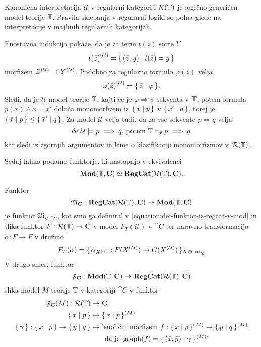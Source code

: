 \documentclass[../kategoricna_logika.tex]{subfiles}
\begin{document}
\begin{izrek}\label{izrek:logicno-genericen-model-regularne-logike}
  Kanonična interpretacija $\mathcal{U}$ v regularni kategoriji
  $\mathcal{R}(\mathbb{T})$ je logično generičen model teorije $\mathbb{T}$. Pravila
  sklepanja v regularni logiki so polna glede na interpretacije v
  majhnih regularnih kategorijah.
\end{izrek}
\begin{dokaz}
  Enostavna indukcija pokaže, da je za term $t(\bar{z})$ sorte $Y$
$${t(\bar{z})}^{(\mathcal{U})} = \lbrace\,(\bar{z},y) \mid  t(\bar{z}) = y\,\rbrace$$
morfizem ${\bar{Z}}^{(\mathcal{U})} \to {Y}^{(\mathcal{U})}$.
Podobno za regularno
formulo $\varphi(\bar{z})$ velja
$${\varphi(\bar{z})}^{(\mathcal{U})} = \lbrace\,\bar{z} \mid  \varphi\,\rbrace.$$
Sledi, da je $\mathcal{U}$ model teorije $\mathbb{T}$, kajti če je
$\varphi \Rightarrow \psi$ sekventa v $\mathbb{T}$, potem formula
$p(\bar{x}) \wedge \bar{x}= \bar{x}'$ določa monomorfizem iz
$\lbrace\,\bar{x} \mid  p\,\rbrace$ v $\lbrace\,\bar{x}' \mid  q\,\rbrace$, torej
je $\lbrace\,\bar{x} \mid  p\,\rbrace \leq \lbrace\,\bar{x}' \mid  q\,\rbrace$.
Za model $\mathcal{U}$ velja tudi, da za vse sekvente
$p \Rightarrow q$ velja
$$\text{če} \ \mathcal{U} \models p \implies q \text{, potem} \ \mathbb{T} \vdash_{\bar{x}} p \implies q$$
kar sledi iz zgornjih argumentov in leme o klasifikaciji monomorfizmov
v~$\mathcal{R}(\mathbb{T})$.
\end{dokaz}
Sedaj lahko podamo funktorje, ki nastopajo v ekvivalenci
$$\mathbf{Mod}(\mathbb{T}, {\operatorname{\mathbf{C}}}) \simeq {\operatorname{\mathbf{RegCat}}}(\mathcal{R}(\mathbb{T}), {\operatorname{\mathbf{C}}}).$$
\begin{definicija}\label{def:ekvivalenca-reg-logike-reg-kategorij}
  Funktor
$$\mathfrak{M}_{{\operatorname{\mathbf{C}}}} : {\operatorname{\mathbf{RegCat}}}(\mathcal{R}(\mathbb{T}), {\operatorname{\mathbf{C}}}) \to \mathbf{Mod}(\mathbb{T}, {\operatorname{\mathbf{C}}})$$
je funktor $\mathfrak{M}_{\mathcal{U}, \cat{C}}$, kot smo ga definiral
v \eqref{equation:def-funktor-iz-regcat-v-mod} in slika funktor
$F : \mathcal{R}(\mathbb{T}) \to {\operatorname{\mathbf{C}}}$ v model $F_T(\mathcal{U})$ v
$\cat{C}$ ter naravno transformacijo $\alpha : F \to F$ v družino
$$F_T(\alpha) = \lbrace\,\alpha_{{X}^{(\mathcal{U})}} : F({X}^{(\mathcal{U})}) \to G({X}^{(\mathcal{U})})\,\rbrace_{X \in \underline{\mathrm{sort}}_{\Sigma}}$$
V drugo smer, funktor
$$\mathfrak{F}_{{\operatorname{\mathbf{C}}}} : \mathbf{Mod}(\mathbb{T}, {\operatorname{\mathbf{C}}}) \to {\operatorname{\mathbf{RegCat}}}(\mathcal{R}(\mathbb{T}), {\operatorname{\mathbf{C}}})$$
slika model $M$ teorije $\mathbb{T}$ v kategoriji $\cat{C}$ v funktor
\begin{align*}
  \mathfrak{F}_{\cat{C}}(M) : \mathcal{R}(\T) &\to \cat{C}\\
  \set{\bar{x} \mid  p} &\mapsto \set{\bar{x} \mid  p}^{(M)} \\
  \set{\gamma} : \set{\bar{x} \mid  p} \to \set{\bar{y} \mid  q} &\mapsto \text{`enolični morfizem} \ f : \set{\bar{x} \mid  p}^{(M)} \to \set{\bar{y} \mid  q}^{(M)} \\ 
                                              &\qquad \text{da je} \ \graf(f) = \set{(\bar{x}, \bar{y})  \mid  \gamma}^{(M)} \text{'}
\end{align*}
\end{definicija}
\end{document}
